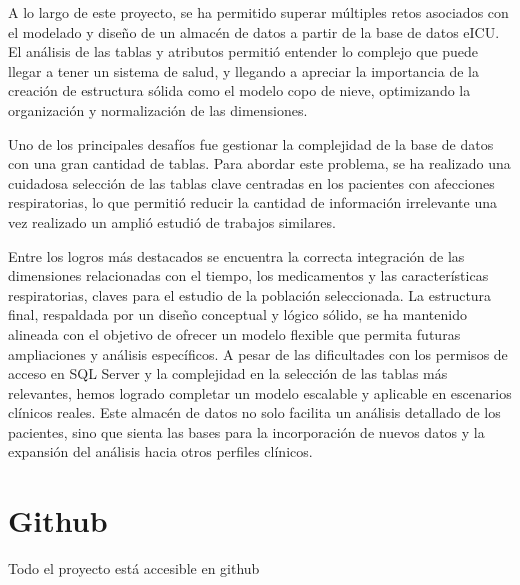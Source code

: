 \documentclass[12pt, a4paper, twoside]{article}
\begin{document}
	A lo largo de este proyecto, se ha permitido superar múltiples retos asociados con el modelado y diseño de un almacén de datos a partir de la base de datos eICU. El análisis de las tablas y atributos permitió entender lo complejo que puede llegar a tener un sistema de salud, y llegando a apreciar la importancia de la creación de estructura sólida como el modelo copo de nieve, optimizando la organización y normalización de las dimensiones.
	
	Uno de los principales desafíos fue gestionar la complejidad de la base de datos con una gran cantidad de tablas. Para abordar este problema, se ha realizado una cuidadosa selección de las tablas clave centradas en los pacientes con afecciones respiratorias, lo que permitió reducir la cantidad de información irrelevante una vez realizado un amplió estudió de trabajos similares.
	
	Entre los logros más destacados se encuentra la correcta integración de las dimensiones relacionadas con el tiempo, los medicamentos y las características respiratorias, claves para el estudio de la población seleccionada. La estructura final, respaldada por un diseño conceptual y lógico sólido, se ha mantenido alineada con el objetivo de ofrecer un modelo flexible que permita futuras ampliaciones y análisis específicos. A pesar de las dificultades con los permisos de acceso en SQL Server y la complejidad en la selección de las tablas más relevantes, hemos logrado completar un modelo escalable y aplicable en escenarios clínicos reales. Este almacén de datos no solo facilita un análisis detallado de los pacientes, sino que sienta las bases para la incorporación de nuevos datos y la expansión del análisis hacia otros perfiles clínicos. 
	
	


	\section{Github}

	Todo el proyecto está accesible en github \cite{depab2024}
	\printbibliography
	
	
	
	
\end{document}
